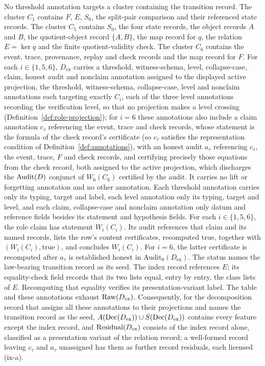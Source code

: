 No threshold annotation targets a cluster containing the transition record. The \Pone{}
cluster \(C_1\) contains \(F\), \(E\), \(S_0\), the split-pair comparison and their referenced
state records. The \Pfive{} cluster \(C_5\) contains \(S_0\), the four state records, the object
records \(A\) and \(B\), the quotient-object record \(\{A,B\}\), the map record for \(q\), the relation
\(E=\ker q\) and the finite quotient-validity check. The \Psix{} cluster \(C_6\)
contains the event, trace, provenance, replay and check records and the map
record for \(F\). For each
\(i\in\{1,5,6\}\), \(D_{\mathrm{ex}}\) carries a threshold, witness-schema,
level, collapse-case, claim, honest audit and nonclaim annotation assigned to
the displayed active projection, the threshold, witness-schema,
collapse-case, level and nonclaim annotations each targeting exactly
\(C_i\), each of the three level annotations recording the verification level,
so that no projection makes a level crossing (Definition~\ref{def:role-projection}); for \(i=6\) these annotations also include a claim annotation
\(c_\tau\) referencing the event, trace and check records, whose statement is the formula of the check record's certificate (so \(c_\tau\) satisfies the representation condition of Definition~\ref{def:annotations}), with an
honest audit \(a_\tau\) referencing \(c_\tau\), the event, trace, \(F\) and
check records, and certifying precisely those equations from the check
record, both assigned to the active \Psix{} projection, which discharges the
\(\operatorname{Audit}\!\left(D\right)\) conjunct of \(W_6(C_6)\) certified by the \Psix{} audit. It
carries no lift or forgetting annotation and no other annotation. Each threshold annotation carries only its typing, target and label, each level annotation only its typing, target and level, and each claim, collapse-case and nonclaim annotation only datum and reference fields besides its statement and hypothesis fields. For each \(i\in\{1,5,6\}\), the role claim has statement \(W_i(C_i)\).
Its audit references that claim and its named records, lists the
row's content certificates, recomputed true, together with
\((W_i(C_i),\mathrm{true})\), and concludes \(W_i(C_i)\).
For \(i=6\), the latter certificate is recomputed after
\(a_\tau\) is established honest in \(\mathrm{Audit}_0(D_{\mathrm{ex}})\). The
\Pfour{} status names the law-bearing transition record as its seed. The index record references \(E\); its equality-check field records that its
two lists equal, entry by entry, the class lists of \(E\). Recomputing that equality
verifies its presentation-variant label. The table and
these annotations exhaust \(\operatorname{Raw}\!\left(D_{\mathrm{ex}}\right)\). Consequently, for the decomposition record that assigns all these annotations to their projections and names the transition record as the \Pfour{} seed, \(A(\operatorname{Dec}\!\left(D_{\mathrm{ex}}\right))\cup S(\operatorname{Dec}\!\left(D_{\mathrm{ex}}\right))\) contains every feature except the index record, and \(\operatorname{Residual}\!\left(D_{\mathrm{ex}}\right)\) consists of the index record alone, classified as a presentation variant of the relation record; a well-formed record leaving \(c_\tau\) and \(a_\tau\) unassigned has them as further record residuals, each licensed (ix-a).

